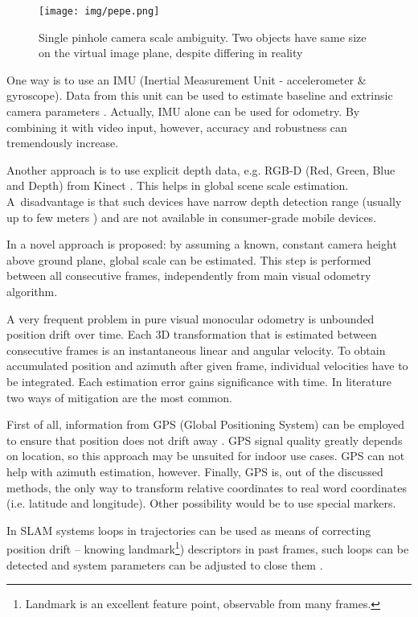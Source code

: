 \begin{figure}[ht]
	\centering\texttt{[image: img/pepe.png]}
	\caption{Single pinhole camera scale ambiguity. Two objects have same size on the virtual image plane, despite differing in reality}
	\label{fig:pepe}
\end{figure}

One way is to use an IMU (Inertial Measurement Unit - accelerometer \& gyroscope). Data from this unit can be used to estimate baseline and extrinsic camera parameters \cite{tracked_vehicles}. Actually, IMU alone can be used for odometry. By combining it with video input, however, accuracy and robustness can tremendously increase.

Another approach is to use explicit depth data, e.g. RGB-D (Red, Green, Blue and Depth) from Kinect \cite{yu2013improved}. This helps in global scene scale estimation. A~disadvantage is that such devices have narrow depth detection range (usually up to few meters \cite{accuracy_and_resoulution}) and are not available in consumer-grade mobile devices.

In \cite{robust_scale} a novel approach is proposed: by assuming a known, constant camera height above ground plane, global scale can be estimated. This step is performed between all consecutive frames, independently from main visual odometry algorithm.

A very frequent problem in pure visual monocular odometry is unbounded position drift over time. Each 3D transformation that is estimated between consecutive frames is an instantaneous linear and angular velocity. To obtain accumulated position and azimuth after given frame, individual velocities have to be integrated. Each estimation error gains significance with time. In literature two ways of mitigation are the most common.

First of all, information from GPS (Global Positioning System) can be employed to ensure that position does not drift away \cite{accurate_global_localization}. GPS signal quality greatly depends on location, so this approach may be unsuited for indoor use cases. GPS can not help with azimuth estimation, however. Finally, GPS is, out of the discussed methods, the only way to transform relative coordinates to real word coordinates (i.e. latitude and longitude). Other possibility would be to use special markers.


In SLAM systems loops in trajectories can be used as means of correcting position drift -- knowing landmark\footnote{Landmark is an excellent feature point, observable from many frames.}) descriptors in past frames, such loops can be detected and system parameters can be adjusted to close them \cite{the_application_of_kalman} \cite{monoslam}.


